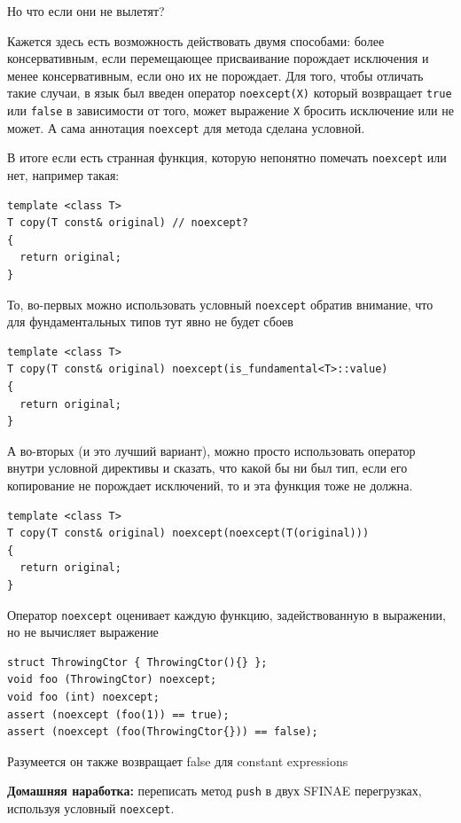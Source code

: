 \documentclass[a4paper,12pt,oneside]{book}
\begin{document}
Но что если они не вылетят?

Кажется здесь есть возможность действовать двумя способами: более консервативным, если перемещающее присваивание порождает исключения и менее консервативным, если оно их не порождает. Для того, чтобы отличать такие случаи, в язык был введен оператор \lstinline!noexcept(X)! который возвращает \lstinline!true! или \lstinline!false! в зависимости от того, может выражение \lstinline!X! бросить исключение или не может. А сама аннотация \lstinline!noexcept! для метода сделана условной.

В итоге если есть странная функция, которую непонятно помечать \lstinline!noexcept! или нет, например такая:

\begin{lstlisting}
template <class T>
T copy(T const& original) // noexcept?
{
  return original;
}
\end{lstlisting}

То, во-первых можно использовать условный \lstinline!noexcept! обратив внимание, что для фундаментальных типов тут явно не будет сбоев

\begin{lstlisting}
template <class T>
T copy(T const& original) noexcept(is_fundamental<T>::value)
{
  return original;
}
\end{lstlisting}

А во-вторых (и это лучший вариант), можно просто использовать оператор внутри условной директивы и сказать, что какой бы ни был тип, если его копирование не порождает исключений, то и эта функция тоже не должна.

\begin{lstlisting}
template <class T>
T copy(T const& original) noexcept(noexcept(T(original)))
{
  return original;
}
\end{lstlisting}

Оператор \lstinline!noexcept! оценивает каждую функцию, задействованную в выражении, но не вычисляет выражение

\begin{lstlisting}
struct ThrowingCtor { ThrowingCtor(){} };
void foo (ThrowingCtor) noexcept;
void foo (int) noexcept;
assert (noexcept (foo(1)) == true);
assert (noexcept (foo(ThrowingCtor{})) == false);
\end{lstlisting}

Разумеется он также возвращает false для constant expressions

\textbf{Домашняя наработка:} переписать метод \lstinline!push! в двух SFINAE перегрузках, используя условный \lstinline!noexcept!.
\end{document}
